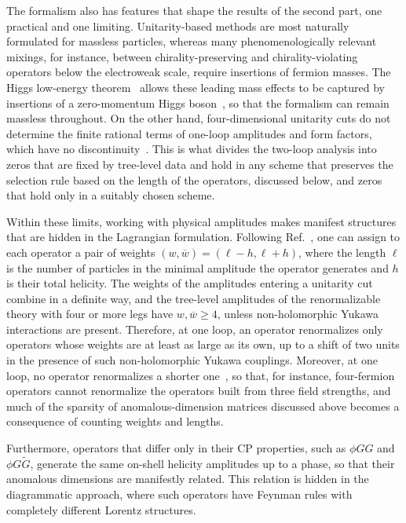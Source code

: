 The formalism also has features that shape the results of the second part, one practical and one
limiting. Unitarity-based methods are most naturally formulated for massless particles, whereas many
phenomenologically relevant mixings, for instance, between chirality-preserving and
chirality-violating operators below the electroweak scale, require insertions of fermion masses. The
Higgs low-energy theorem~\cite{Ellis:1975ap,Shifman:1979eb} allows these leading mass effects to be
captured by insertions of a zero-momentum Higgs boson~\cite{Balkin:2021dko,Bertuzzo:2023slg}, so
that the formalism can remain massless throughout. 
On the other hand, four-dimensional unitarity
cuts do not determine the finite rational terms of one-loop amplitudes and form factors, which have
no discontinuity~\cite{Bern:1994zx,Bern:1994cg}. This is what divides the two-loop analysis into
zeros that are fixed by tree-level data and hold in any scheme that preserves the selection rule
based on the length of the operators, discussed below, and zeros that hold only in a suitably chosen
scheme.

Within these limits, working with physical amplitudes makes manifest structures that are hidden in the Lagrangian formulation. Following
Ref.~\cite{Cheung:2015aba}, one can assign to each operator a pair of weights $(w,\overline
w)=(\ell-h,\ell+h)$, where the length $\ell$ is the number of particles in the minimal amplitude
the operator generates and $h$ is their total helicity. The weights of the amplitudes entering a
unitarity cut combine in a definite way, and the tree-level amplitudes of the renormalizable theory
with four or more legs have $w,\overline w\ge4$, 
unless non-holomorphic Yukawa interactions are present.
Therefore, at one loop, an operator renormalizes only operators whose weights are at
least as large as its own, up to a shift of two units in the presence of such non-holomorphic Yukawa
couplings. Moreover, at one loop, no operator renormalizes a shorter one~\cite{Bern:2019wie}, so
that, for instance, four-fermion operators cannot renormalize the operators built from three field
strengths, and much of the sparsity of anomalous-dimension matrices discussed above becomes a
consequence of counting weights and lengths. 

Furthermore, operators that differ only in their CP
properties, such as $\phi GG$ and $\phi G\widetilde G$, generate the same on-shell helicity amplitudes up to a phase, so that their anomalous dimensions are manifestly related. 
This
relation is hidden in the diagrammatic approach, where such operators have Feynman rules with completely different
Lorentz structures. 


